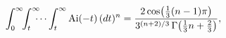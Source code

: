 \[\int_{0}^{\infty}\!\!\int_{t}^{\infty}\!\!\!\!\cdots\int_{t}^{\infty}\mathop{%
\mathrm{Ai}\/}\nolimits\!\left({-}t\right)(dt)^{n}=\frac{2\mathop{\cos\/}%
\nolimits\!\left(\tfrac{1}{3}(n-1)\pi\right)}{3^{(n+2)/3}\mathop{\Gamma\/}%
\nolimits\!\left(\tfrac{1}{3}n+\tfrac{2}{3}\right)},\]